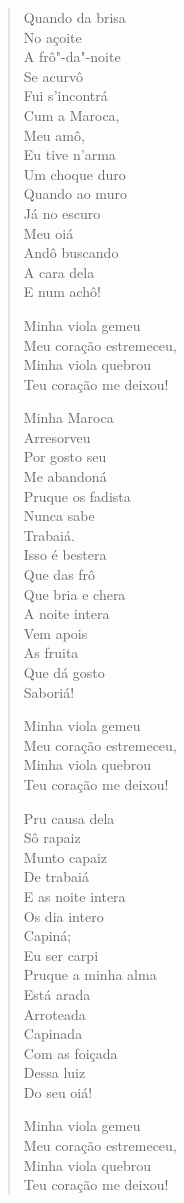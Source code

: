 \begin{verse}
Quando da brisa\\
No açoite\\
A frô"-da"-noite\\
Se acurvô\\
Fui s'incontrá\\
Cum a Maroca,\\
Meu amô,\\
Eu tive n'arma\\
Um choque duro\\
Quando ao muro\\
Já no escuro\\
Meu oiá\\
Andô buscando\\
A cara dela\\
E num achô!

Minha viola gemeu\\
Meu coração estremeceu,\\
Minha viola quebrou\\
Teu coração me deixou!

Minha Maroca\\
Arresorveu\\
Por gosto seu\\
Me abandoná\\
Pruque os fadista\\
Nunca sabe\\
Trabaiá.\\
Isso é bestera\\
Que das frô\\
Que bria e chera\\
A noite intera\\
Vem apois\\
As fruita\\
Que dá gosto\\
Saboriá!

Minha viola gemeu\\
Meu coração estremeceu,\\
Minha viola quebrou\\
Teu coração me deixou!

Pru causa dela\\
Sô rapaiz\\
Munto capaiz\\
De trabaiá\\
E as noite intera\\
Os dia intero\\
Capiná;\\
Eu ser carpi\\
Pruque a minha alma\\
Está arada\\
Arroteada\\
Capinada\\
Com as foiçada\\
Dessa luiz\\
Do seu oiá!

Minha viola gemeu\\
Meu coração estremeceu,\\
Minha viola quebrou\\
Teu coração me deixou!
\end{verse}

